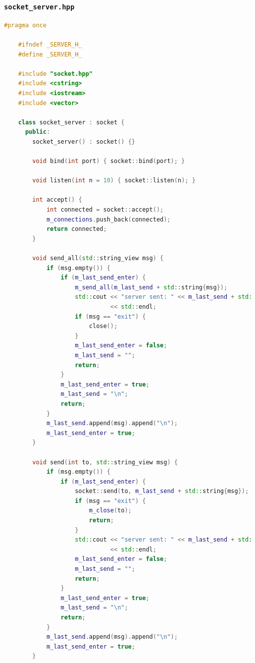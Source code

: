 \documentclass{article}
\begin{document}
\subsubsection{\texttt{socket\_server.hpp}}

\begin{lstlisting}[language=C++]
    #pragma once

    #ifndef _SERVER_H_
    #define _SERVER_H_
    
    #include "socket.hpp"
    #include <cstring>
    #include <iostream>
    #include <vector>
    
    class socket_server : socket {
      public:
        socket_server() : socket() {}
    
        void bind(int port) { socket::bind(port); }
    
        void listen(int n = 10) { socket::listen(n); }
    
        int accept() {
            int connected = socket::accept();
            m_connections.push_back(connected);
            return connected;
        }
    
        void send_all(std::string_view msg) {
            if (msg.empty()) {
                if (m_last_send_enter) {
                    m_send_all(m_last_send + std::string{msg});
                    std::cout << "server sent: " << m_last_send + std::string{msg}
                              << std::endl;
                    if (msg == "exit") {
                        close();
                    }
                    m_last_send_enter = false;
                    m_last_send = "";
                    return;
                }
                m_last_send_enter = true;
                m_last_send = "\n";
                return;
            }
            m_last_send.append(msg).append("\n");
            m_last_send_enter = true;
        }
    
        void send(int to, std::string_view msg) {
            if (msg.empty()) {
                if (m_last_send_enter) {
                    socket::send(to, m_last_send + std::string{msg});
                    if (msg == "exit") {
                        m_close(to);
                        return;
                    }
                    std::cout << "server sent: " << m_last_send + std::string{msg}
                              << std::endl;
                    m_last_send_enter = false;
                    m_last_send = "";
                    return;
                }
                m_last_send_enter = true;
                m_last_send = "\n";
                return;
            }
            m_last_send.append(msg).append("\n");
            m_last_send_enter = true;
        }
    

\end{lstlisting}
\end{document}
